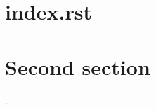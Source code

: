 \usepackage[utf8]{inputenc}
\usepackage[T1]{fontenc}
\usepackage{imakeidx}
\usepackage{alphalph}
\usepackage{enumitem}
\makeindex[columns=3, title=Alphabetical Index]



\tableofcontents

\graphicspath{ {/docs-1/src/index.rst/} }
\section{index.rst}


\clearpage

\section{Second section}
.

\printindex

